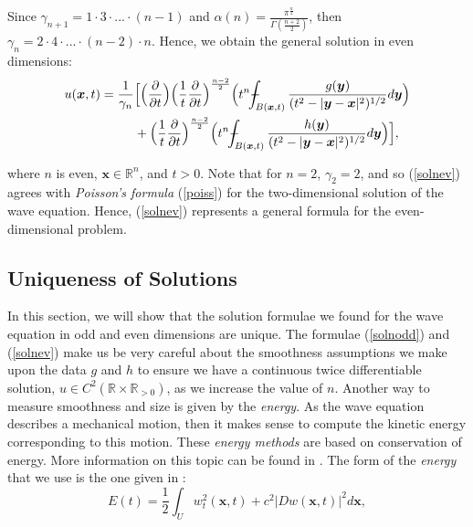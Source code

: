 \documentclass[a4paper, 12pt]{article}
\def\Xint#1{\mathchoice
{\XXint\displaystyle\textstyle{#1}}%
{\XXint\textstyle\scriptstyle{#1}}%
{\XXint\scriptstyle\scriptscriptstyle{#1}}%
{\XXint\scriptscriptstyle\scriptscriptstyle{#1}}%
\!\int}
\def\XXint#1#2#3{{\setbox0=\hbox{$#1{#2#3}{\int}$ }
\vcenter{\hbox{$#2#3$ }}\kern-.6\wd0}}
\def\dashint{\Xint-}
\numberwithin{equation}{section}
\begin{document}
Since $\gamma_{n+1}=1 \cdot 3 \cdot ... \cdot (n-1)$ and
$\alpha(n)=\frac{\pi^{\frac{n}{2}}}{\Gamma(\frac{n+2}{2})}$, then $\gamma_n=2
\cdot 4 \cdot ... \cdot(n-2) \cdot n$. Hence, we obtain the general solution in
even dimensions:
\begin{equation} \label{solnev}
    \begin{split}
        u(\boldsymbol{x}, t)= \frac{1}{\gamma_n} &\Big[ \Big(\diffp[1]{}{t}\Big) \Big(\frac{1}{t} \diffp[1]{}{t}\Big)^{\frac{n-2}{2}}\Big(t^n \dashint_{B(\boldsymbol{x}, t)} \frac{g(\boldsymbol{y})}{(t^2-|\boldsymbol{y}-\boldsymbol{x}|^2)^{1/2}} d \boldsymbol{y} \Big)\\
        & +\Big(\frac{1}{t} \diffp[1]{}{t}\Big)^{\frac{n-2}{2}}\Big(t^n \dashint_{B(\boldsymbol{x},t)} \frac{h(\boldsymbol{y})}{(t^2-|\boldsymbol{y}-\boldsymbol{x}|^2)^{1/2}} d \boldsymbol{y} \Big) \Big],
    \end{split}
\end{equation}

where $n$ is even, $\boldsymbol{x}\in \mathbb{R}^n$, and $t>0$. Note that for
$n=2$, $\gamma_2 = 2$, and so (\ref{solnev}) agrees with \emph{Poisson's formula}
(\ref{poiss}) for the two-dimensional solution of the wave equation. Hence,
(\ref{solnev}) represents a general formula for the even-dimensional problem.


\subsection{Uniqueness of Solutions} \label{uniqueness}
In this section, we will show that the solution formulae we found for the wave
equation in odd and even dimensions are unique. The formulae (\ref{solnodd}) and
(\ref{solnev}) make us be very careful about the smoothness assumptions we make
upon the data $g$ and $h$ to ensure we have a continuous twice differentiable
solution, $u \in C^2(\mathbb{R} \times \mathbb{R}_{>0})$, as we increase the
value of $n$. Another way to measure smoothness and size is given by the
\emph{energy}. As the wave equation describes a mechanical motion, then
it makes sense to compute the kinetic energy corresponding to this motion. These
\emph{energy methods} are based on conservation of energy. More information on this topic can be found in
\cite[Chapter VI, Section 6]{Hil}. The form of the \emph{energy} that we use is
the one given in \cite[Ch. 2.4.3.a, Th. 5]{Ev}:
\begin{equation} \label{energy}
    E(t)=\frac{1}{2}\int_U w_t^2(\boldsymbol{x}, t)+c^2|Dw(\boldsymbol{x}, t)|^2d\boldsymbol{x},
\end{equation}
\end{document}
